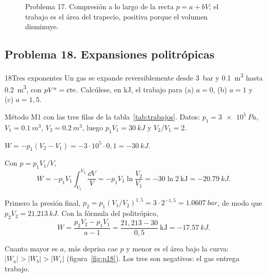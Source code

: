 \begin{figure}[htbp]
\centering
{}
\caption{Problema 17. Compresión a lo largo de la recta $p=a+bV$; el trabajo es el área del trapecio, positiva
porque el volumen disminuye.}
\label{fig:p17}
\end{figure}

\subsection{Problema 18. Expansiones politrópicas}
\begin{problema}{18}{Tres exponentes}
Un gas se expande reversiblemente desde \SI{3}{bar} y \SI{0,1}{m^3} hasta \SI{0,2}{m^3}, con $pV^a=\mathrm{cte}$.
Calcúlese, en kJ, el trabajo para (a) $a=0$, (b) $a=1$ y (c) $a=1{,}5$.
\end{problema}

\begin{resolucion}
\idea Método M1 con las tres filas de la tabla~\ref{tab:trabajos}. Datos: $p_1=\SI{3e5}{Pa}$,
$V_1=\SI{0,1}{m^3}$, $V_2=\SI{0,2}{m^3}$, luego $p_1V_1=\SI{30}{kJ}$ y $V_2/V_1=2$.

$W=-p_1(V_2-V_1)=-3\cdot10^{5}\cdot0{,}1=\boxed{-\SI{30}{kJ}}$.

 Con $p=p_1V_1/V$,
\[
  W=-p_1V_1\int_{V_1}^{V_2}\frac{\dd V}{V}=-p_1V_1\ln\frac{V_2}{V_1}=-30\ln2\ \mathrm{kJ}=\boxed{-\SI{20,79}{kJ}}.
\]

 Primero la presión final, $p_2=p_1(V_1/V_2)^{1{,}5}=3\cdot2^{-1{,}5}=\SI{1,0607}{bar}$, de
modo que $p_2V_2=\SI{21,213}{kJ}$. Con la fórmula del politrópico,
\[
  W=\frac{p_2V_2-p_1V_1}{a-1}=\frac{21{,}213-30}{0{,}5}\ \mathrm{kJ}=\boxed{-\SI{17,57}{kJ}}.
\]

 Cuanto mayor es $a$, más deprisa cae $p$ y menor es el área bajo la curva:
$|W_a|>|W_b|>|W_c|$ (figura~\ref{fig:p18}). Los tres son negativos: el gas entrega trabajo.
\end{resolucion}

